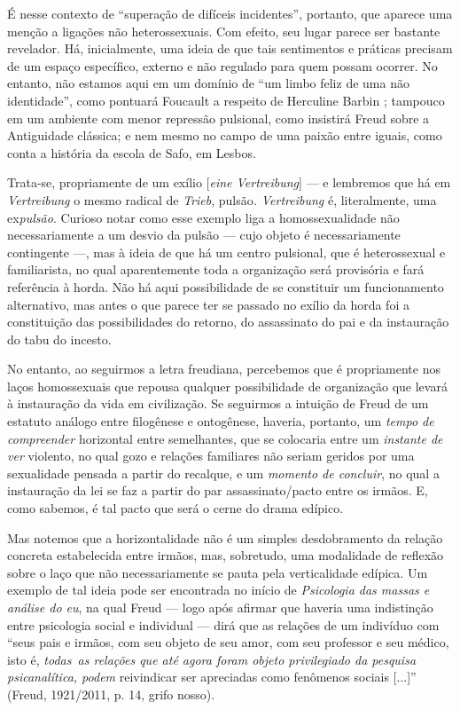É nesse contexto de ``superação de difíceis incidentes'', portanto, que
aparece uma menção a ligações não heterossexuais. Com efeito, seu lugar
parece ser bastante revelador. Há, inicialmente, uma ideia de que tais
sentimentos e práticas precisam de um espaço específico, externo e não
regulado para quem possam ocorrer. No entanto, não estamos aqui em um
domínio de ``um limbo feliz de uma não identidade'', como pontuará
Foucault a respeito de Herculine Barbin ; tampouco em um ambiente com
menor repressão pulsional, como insistirá Freud sobre a Antiguidade
clássica; e nem mesmo no campo de uma paixão entre iguais, como conta a
história da escola de Safo, em Lesbos.

Trata-se, propriamente de um exílio {[}\emph{eine Vertreibung}{]} --- e
lembremos que há em \emph{Vertreibung} o mesmo radical de \emph{Trieb},
pulsão\emph{.} \emph{Vertreibung} é, literalmente, uma ex\emph{pulsão}.
Curioso notar como esse exemplo liga a homossexualidade não
necessariamente a um desvio da pulsão --- cujo objeto é necessariamente
contingente ---, mas à ideia de que há um centro pulsional, que é
heterossexual e familiarista, no qual aparentemente toda a organização
será provisória e fará referência à horda. Não há aqui possibilidade de
se constituir um funcionamento alternativo, mas antes o que parece ter
se passado no exílio da horda foi a constituição das possibilidades do
retorno, do assassinato do pai e da instauração do tabu do incesto.

No entanto, ao seguirmos a letra freudiana, percebemos que é
propriamente nos laços homossexuais que repousa qualquer possibilidade
de organização que levará à instauração da vida em civilização. Se
seguirmos a intuição de Freud de um estatuto análogo entre filogênese e
ontogênese, haveria, portanto, um \emph{tempo de compreender} horizontal
entre semelhantes, que se colocaria entre um \emph{instante de ver}
violento, no qual gozo e relações familiares não seriam geridos por uma
sexualidade pensada a partir do recalque, e um \emph{momento de
concluir}, no qual a instauração da lei se faz a partir do par
assassinato/pacto entre os irmãos. E, como sabemos, é tal pacto que será
o cerne do drama edípico.

Mas notemos que a horizontalidade não é um simples desdobramento da
relação concreta estabelecida entre irmãos, mas, sobretudo, uma
modalidade de reflexão sobre o laço que não necessariamente se pauta
pela verticalidade edípica. Um exemplo de tal ideia pode ser encontrada
no início de \emph{Psicologia das massas e análise do eu}, na qual Freud
--- logo após afirmar que haveria uma indistinção entre psicologia
social e individual --- dirá que as relações de um indivíduo com ``seus
pais e irmãos, com seu objeto de seu amor, com seu professor e seu
médico, isto é, \emph{todas~as relações que até agora foram objeto
privilegiado da pesquisa psicanalítica, podem} reivindicar ser
apreciadas como fenômenos sociais {[}...{]}'' (Freud, 1921/2011, p. 14,
grifo nosso).

